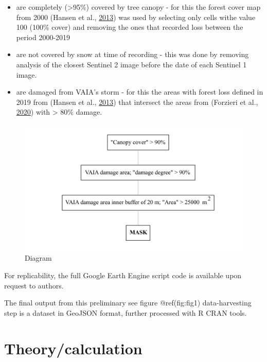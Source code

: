 \documentclass[smallextended]{svjour3}       %
\begin{document}
\begin{itemize}
\item
  are completely (\textgreater{}95\%) covered by tree canopy - for this
  the forest cover map from 2000 (Hansen et al.,
  \protect\hyperlink{ref-Hansen2013}{2013}) was used by selecting only
  cells withe value 100 (100\% cover) and removing the ones that
  recorded loss between the period 2000-2019
\item
  are not covered by snow at time of recording - this was done by
  removing analysis of the closest Sentinel 2 image before the date of
  each Sentinel 1 image.
\item
  are damaged from VAIA's storm - for this the areas with forest loss
  defined in 2019 from (Hansen et al.,
  \protect\hyperlink{ref-Hansen2013}{2013}) that intersect the areas
  from (Forzieri et al., \protect\hyperlink{ref-Forzieri2020}{2020})
  with \textgreater{} 80\% damage.
\end{itemize}

\begin{figure}
\centering
\includegraphics{paper2_files/figure-latex/fig1-1.pdf}
\caption{Diagram}
\end{figure}

For replicability, the full Google Earth Engine script code is available
upon request to authors.

The final output from this preliminary see figure @ref(fig:fig1)
data-harvesting step is a dataset in GeoJSON format, further processed
with R CRAN tools.

\hypertarget{theorycalculation}{%
\section{Theory/calculation}\label{theorycalculation}}
\end{document}
